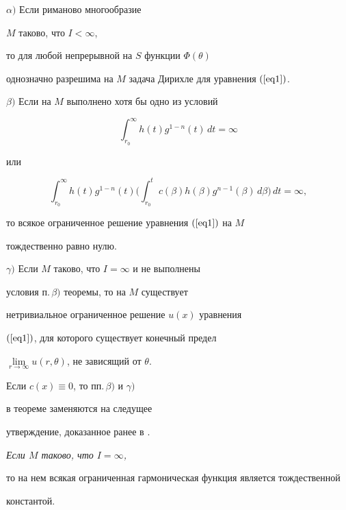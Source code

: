 \begin{thmnonum} $\alpha)$ Если риманово многообразие


$M$ таково, что $I<\infty$,


то для любой непрерывной на $S$ функции $\Phi(\theta)$ 


однозначно разрешима на $M$ задача Дирихле для уравнения $(\ref{eq1})$.





$\beta)$ Если на $M$ выполнено хотя бы одно из условий


$$


\int_{r_0}^{\infty} h(t)g^{1-n}(t)\,dt=\infty


$$


или


$$


\int_{r_0}^{\infty}h(t)g^{1-n}(t)


\biggl(\int_{r_0}^t c(\beta)h(\beta)g^{n-1}(\beta)\,d\beta\biggr)\,dt=\infty,


$$


то всякое ограниченное решение уравнения $(\ref{eq1})$ на $M$


тождественно равно нулю.





$\gamma)$ Если $M$ таково, что $I=\infty$ и не выполнены


условия п.\,$\beta)$ теоремы, то на $M$ существует


нетривиальное ограниченное решение $u(x)$ уравнения


$(\ref{eq1})$, для которого существует конечный предел


$\lim\limits_{r\to\infty}u(r,\theta)$, не зависящий от $\theta$.


\end{thmnonum}





\begin{note} Если $c(x)\equiv 0$, то пп.\,$\beta)$ и $\gamma)$


в теореме заменяются на следущее


утверждение, доказанное ранее в \cite{Los}.


{\it Если $M$ таково, что $I=\infty$,


то на нем всякая ограниченная гармоническая функция является тождественной


константой.}


\end{note}





